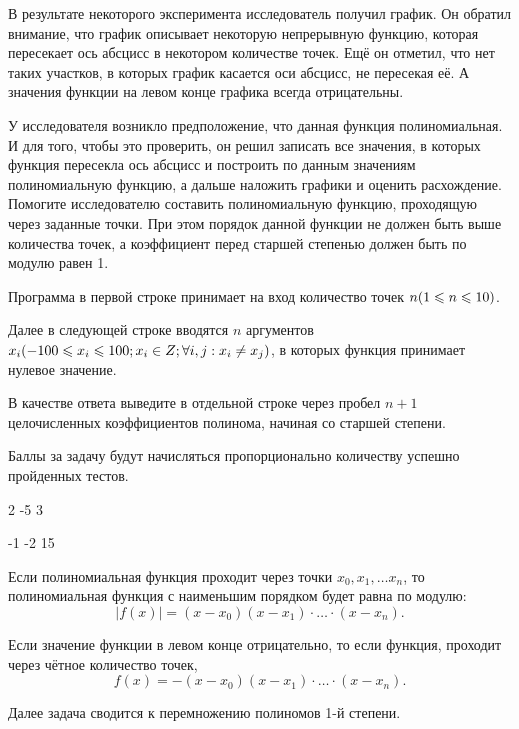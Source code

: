 
В результате некоторого эксперимента исследователь получил график. Он обратил внимание, что график описывает некоторую непрерывную функцию, которая пересекает ось абсцисс в некотором количестве точек. Ещё он отметил, что нет таких участков, в которых график касается оси абсцисс, не пересекая её. А значения функции на левом конце графика всегда отрицательны.

У исследователя возникло предположение, что данная функция полиномиальная. И для того, чтобы это проверить, он решил записать все значения, в которых функция пересекла ось абсцисс и построить по данным значениям полиномиальную функцию, а дальше наложить графики и оценить расхождение. Помогите исследователю составить полиномиальную функцию, проходящую через заданные точки. При этом порядок данной функции не должен быть выше количества точек, а коэффициент перед старшей степенью должен быть по модулю равен 1.


Программа в первой строке принимает на вход количество точек $n\space(1\leq n\leq 10)$.

Далее в следующей строке вводятся $n$  аргументов $x_i \space (-100 \leq x_i \leq 100; x_i \in Z; \forall i, j:x_i \neq x_j)$, в которых функция принимает нулевое значение. 

\outputfmtSection

В качестве ответа выведите в отдельной строке через пробел $n+1$ целочисленных коэффициентов полинома, начиная со старшей степени.

\markSection

Баллы за задачу будут начисляться пропорционально количеству успешно пройденных тестов.


\begin{myverbbox}[\small]{\vinput}
    2
    -5 3
\end{myverbbox}

\begin{myverbbox}[\small]{\voutput}
    -1 -2 15
\end{myverbbox}

\solutionSection
Если полиномиальная функция проходит через точки $x_0, x_1,\dots x_n$, то полиномиальная функция с наименьшим порядком будет равна по модулю:
$$|f(x)| = (x - x_0)(x - x_1)\cdot\dots\cdot(x - x_n).$$ 

Если значение функции в левом конце отрицательно, то если функция, проходит через чётное количество точек,   
$$f(x) = -(x - x_0)(x - x_1)\cdot\dots\cdot(x - x_n).$$ 

Далее задача сводится к перемножению полиномов 1-й степени.

